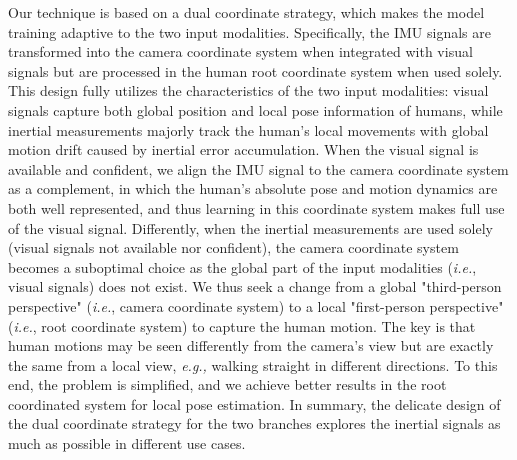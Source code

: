 Our technique is based on a dual coordinate strategy, which makes the model training adaptive to the two input modalities.
%
Specifically, the IMU signals are transformed into the camera coordinate system when integrated with visual signals but are processed in the human root coordinate system when used solely.
%
This design fully utilizes the characteristics of the two input modalities: visual signals capture both global position and local pose information of humans, while inertial measurements majorly track the human's local movements with global motion drift caused by inertial error accumulation. 
%
When the visual signal is available and confident, we align the IMU signal to the camera coordinate system as a complement, in which the human's absolute pose and motion dynamics are both well represented, and thus learning in this coordinate system makes full use of the visual signal.
%
%
Differently, when the inertial measurements are used solely (visual signals not available nor confident), the camera coordinate system becomes a suboptimal choice as the global part of the input modalities (\textit{i.e.}, visual signals) does not exist.
%
We thus seek a change from a global "third-person perspective" (\textit{i.e.}, camera coordinate system) to a local "first-person perspective" (\textit{i.e.}, root coordinate system) to capture the human motion.
%
The key is that human motions may be seen differently from the camera's view but are exactly the same from a local view, \textit{e.g.,} walking straight in different directions.
%
To this end, the problem is simplified, and we achieve better results in the root coordinated system for local pose estimation.
%
In summary, the delicate design of the dual coordinate strategy for the two branches explores the inertial signals as much as possible in different use cases.

